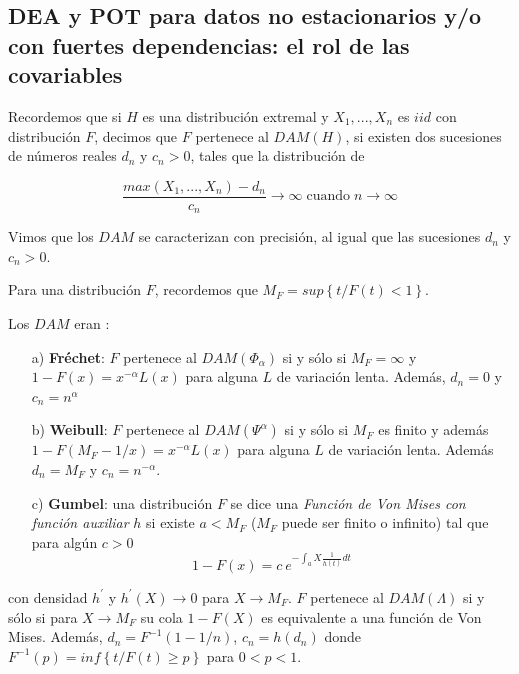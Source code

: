\documentclass[
  12pt]{article}
\begin{document}
\subsection{DEA y POT para datos no estacionarios y/o con fuertes dependencias: el rol de las covariables}\label{sec:cap4}

Recordemos que si \(H\) es una distribución extremal y \(X_1,...,X_n\)
es \(iid\) con distribución \(F\), decimos que \(F\) pertenece al
\(DAM(H)\), si existen dos sucesiones de números reales \(d_n\) y
\(c_n>0\), tales que la distribución de

\begin{equation}
\frac{max(X_1,...,X_n)- d_n}{c_n}\longrightarrow \infty \;\text{cuando}\;n\longrightarrow \infty
\end{equation}

Vimos que los \(DAM\) se caracterizan con precisión, al igual que las
sucesiones \(d_n\) y \(c_n>0\).

Para una distribución \(F\), recordemos que
\(M_F= sup\left\{ t / F(t)<1  \right\}\).

Los \(DAM\) eran :

\begin{itemize}
\item[a)] \textbf{Fréchet}: $F$ pertenece al $DAM(\Phi_{\alpha})$ si y sólo si $M_F= \infty$ y $1-F(x)=x^{-\alpha} L(x)$ para alguna $L$ de variación lenta. Además, $d_n=0$ y $c_n= n^{\alpha}$
\item[b)] \textbf{Weibull}: $F$ pertenece al $DAM(\Psi^{\alpha})$ si y sólo si $M_F$ es finito y además $1-F(M_F -1/x)=x^{-\alpha} L(x)$ para alguna $L$ de variación lenta. Además $d_n= M_F$ y $c_n= n^{-\alpha}$.
\item[c)] \textbf{Gumbel}: una distribución $F$ se dice una \textit{Función de Von Mises con función auxiliar} $h$ si existe $a < M_F$ ($M_F$
puede ser finito o infinito) tal que para algún $c>0$
\begin{equation}
1-F(x)=c\:e^{-\int_a X \frac{1}{h(t)}dt}
\end{equation}
\end{itemize}

con densidad \(h^{\prime}\) y \(h^{\prime}(X)\longrightarrow 0\) para
\(X\longrightarrow M_F\). \(F\) pertenece al \(DAM(\Lambda)\) si y sólo
si para \(X\longrightarrow M_F\) su cola \(1-F(X)\) es equivalente a una
función de Von Mises. Además, \(d_n=F^{-1}(1-1/n)\), \(c_n=h(d_n)\)
donde \(F^{-1}(p)=inf\left\{ t / F(t)\geq p  \right\}\) para \(0<p<1\).
\end{document}
